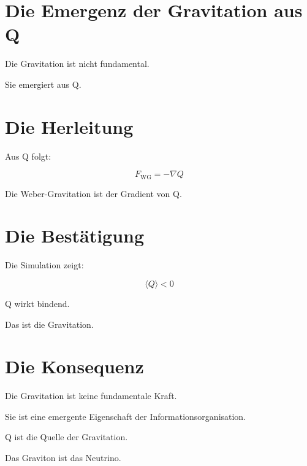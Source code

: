 
\section{Die Emergenz der Gravitation aus Q}

Die Gravitation ist nicht fundamental.

Sie emergiert aus Q.

\section{Die Herleitung}

Aus Q folgt:

\[
F_{\text{WG}} = -\nabla Q
\]

Die Weber-Gravitation ist der Gradient von Q.

\section{Die Bestätigung}

Die Simulation zeigt:

\[
\langle Q \rangle < 0
\]

Q wirkt bindend.

Das ist die Gravitation.

\section{Die Konsequenz}

Die Gravitation ist keine fundamentale Kraft.

Sie ist eine emergente Eigenschaft der Informationsorganisation.

Q ist die Quelle der Gravitation.

Das Graviton ist das Neutrino.